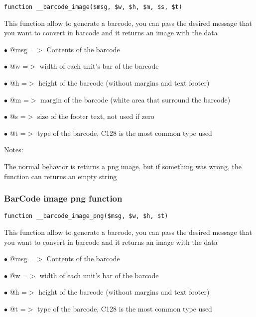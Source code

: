 \documentclass[a4paper]{article}
\begin{document}
\begin{lstlisting}
function __barcode_image($msg, $w, $h, $m, $s, $t)
\end{lstlisting}

This function allow to generate a barcode, you can pass the desired
message that you want to convert in barcode and it returns an image
with the data

\begin{compactitem}
\item[\color{myblue}$\bullet$] @msg =$>$ Contents of the barcode
\item[\color{myblue}$\bullet$] @w   =$>$ width of each unit's bar of the barcode
\item[\color{myblue}$\bullet$] @h   =$>$ height of the barcode (without margins and text footer)
\item[\color{myblue}$\bullet$] @m   =$>$ margin of the barcode (white area that surround the barcode)
\item[\color{myblue}$\bullet$] @s   =$>$ size of the footer text, not used if zero
\item[\color{myblue}$\bullet$] @t   =$>$ type of the barcode, C128 is the most common type used
\end{compactitem}

Notes:

The normal behavior is returns a png image, but if something was wrong,
the function can returns an empty string

\hypertarget{toc387}{}
\subsubsection{BarCode image png function}

\begin{lstlisting}
function __barcode_image_png($msg, $w, $h, $t)
\end{lstlisting}

This function allow to generate a barcode, you can pass the desired
message that you want to convert in barcode and it returns an image
with the data

\begin{compactitem}
\item[\color{myblue}$\bullet$] @msg =$>$ Contents of the barcode
\item[\color{myblue}$\bullet$] @w   =$>$ width of each unit's bar of the barcode
\item[\color{myblue}$\bullet$] @h   =$>$ height of the barcode (without margins and text footer)
\item[\color{myblue}$\bullet$] @t   =$>$ type of the barcode, C128 is the most common type used
\end{compactitem}
\end{document}
